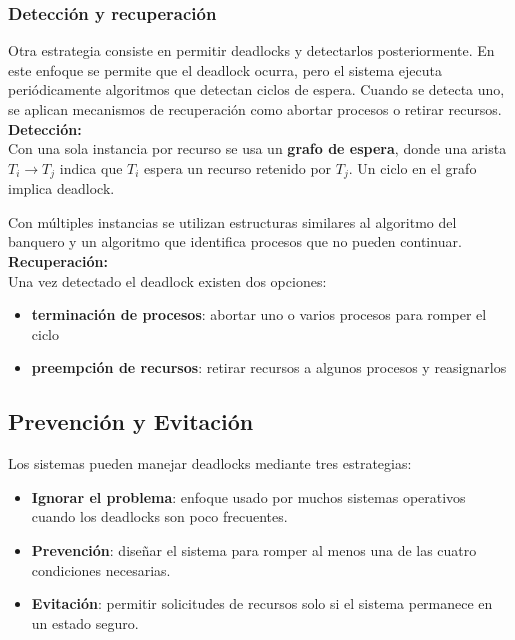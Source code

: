 \documentclass[12pt,letterpaper]{article}
\begin{document}
\subsubsection*{Detección y recuperación}

Otra estrategia consiste en permitir deadlocks y detectarlos posteriormente. En este enfoque se permite que el deadlock ocurra, pero el sistema ejecuta periódicamente algoritmos que detectan ciclos de espera. Cuando se detecta uno, se aplican mecanismos de recuperación como abortar procesos o retirar recursos.\\

\textbf{Detección:}\\

\noindent
Con una sola instancia por recurso se usa un \textbf{grafo de espera}, donde una arista $T_i \rightarrow T_j$ indica que $T_i$ espera un recurso retenido por $T_j$. Un ciclo en el grafo implica deadlock.

Con múltiples instancias se utilizan estructuras similares al algoritmo del banquero y un algoritmo que identifica procesos que no pueden continuar.\\

\textbf{Recuperación:}\\

\noindent
Una vez detectado el deadlock existen dos opciones:

\begin{itemize}
\item \textbf{terminación de procesos}: abortar uno o varios procesos
para romper el ciclo
\item \textbf{preempción de recursos}: retirar recursos a algunos
procesos y reasignarlos
\end{itemize}

\subsection*{Prevención y Evitación}

Los sistemas pueden manejar deadlocks mediante tres estrategias:

\begin{itemize}
\item \textbf{Ignorar el problema}: enfoque usado por muchos sistemas operativos cuando los deadlocks son poco frecuentes.
\item \textbf{Prevención}: diseñar el sistema para romper al menos una de las cuatro condiciones necesarias.
\item \textbf{Evitación}: permitir solicitudes de recursos solo si el sistema permanece en un estado seguro.
\end{itemize}
\end{document}
